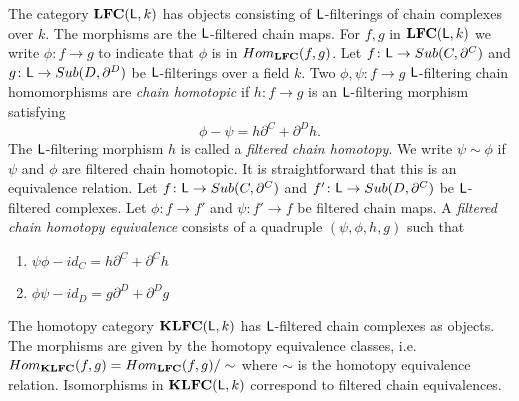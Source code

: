 The category ${\bf LFC}({\mathsf L},k)$ has objects consisting of ${\mathsf L}$-filterings of chain complexes over $k$.  The morphisms are the ${\mathsf L}$-filtered chain maps.  For $f,g$ in ${\bf LFC}({\mathsf L},k)$ we write $\phi\colon f\to g$ to indicate that $\phi$ is in $Hom_{{\bf LFC}}(f,g)$.   Let $f \colon {\mathsf L}\to Sub(C,\partial^C)$ and $g \colon {\mathsf L}\to Sub(D,\partial^D)$ be ${\mathsf L}$-filterings over a field $k$.  
Two $\phi,\psi \colon f\to g$  ${\mathsf L}$-filtering chain homomorphisms are {\em chain homotopic} if $h\colon f\to g$ is an ${\mathsf L}$-filtering morphism satisfying
\[
\phi -\psi = h\partial^C+\partial^Dh.
\]
The ${\mathsf L}$-filtering morphism $h$ is called a {\em filtered chain homotopy}.  
We write $\psi\sim \phi$ if $\psi$ and $\phi$ are filtered chain homotopic.  
It is straightforward that this is an equivalence relation.    Let $f \colon {\mathsf L}\to Sub(C,\partial^C)$ and $f' \colon {\mathsf L}\to Sub(D,\partial^C)$ be ${\mathsf L}$-filtered complexes.  
Let $\phi \colon f\to f'$ and $\psi \colon f'\to f$ be filtered chain maps.  
A {\em filtered chain homotopy equivalence} consists of a quadruple $(\psi,\phi,h,g)$ such that 
\begin{enumerate}
\item $\psi\phi-id_C= h \partial^C + \partial^C h$
\item $\phi\psi-id_D = g \partial^D+\partial^D g$
\end{enumerate}



The homotopy category ${\bf K}{\bf LFC}({\mathsf L},k)$ has ${\mathsf L}$-filtered chain complexes as objects.
The morphisms are given by the homotopy equivalence classes, i.e.\ $Hom_{{\bf K}{\bf LFC}}(f,g) = Hom_{{\bf LFC}}(f,g)/\sim$ where $\sim$ is the homotopy equivalence relation.   
Isomorphisms in ${\bf K}{\bf LFC}({\mathsf L},k)$ correspond to filtered chain equivalences.





